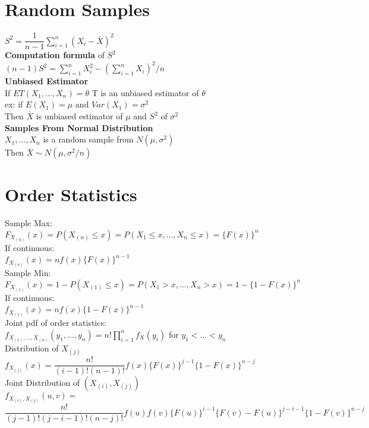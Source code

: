 \documentclass{article}
\begin{document}
\begin{flushleft}
\section*{Random Samples}
$S^2=\dfrac{1}{n-1}\sum_{i=1}^{n}(X_i-\bar{X})^2$\\
\textbf{Computation formula} of $S^2$\\
$(n-1)S^2=\sum_{i=1}^{n}X_i^2-\left(\sum_{i=1}^{n}X_i\right)^2/n$\\
\textbf{Unbiased Estimator}\\
If $ET(X_1,\dots,X_n)=\theta$ T is an unbiased estimator of $\theta$\\
ex: if $E(X_1)=\mu$ and $Var(X_1)=\sigma^2$ \\
Then $\bar{X}$ is unbiased estimator of $\mu$ and $S^2$ of $\sigma^2$\\
\textbf{Samples From Normal Distribution}\\
$X_1,\dots,X_n$ is a random sample from $N(\mu,\sigma^2)$\\
Then $\bar{X}\sim N(\mu,\sigma^2/n)$\\
\section*{Order Statistics}
Sample Max:\\
$F_{X_{(n)}}(x)=P(X_{(n)}\leq x)=P(X_1\leq x,\dots,X_n\leq x)=\{F(x)\}^n$\\
If continuous:\\
$f_{X_{(n)}}(x)=nf(x)\{F(x)\}^{n-1}$\\
Sample Min:\\
$F_{X_{(1)}}(x)=1-P(X_{(1)}\leq x)=P(X_1> x,\dots,X_n> x)=1-\{1-F(x)\}^n$\\
If continuous:\\
$f_{X_{(1)}}(x)=nf(x)\{1-F(x)\}^{n-1}$\\
Joint pdf of order statistics:\\
$f_{X_{(1)},\dots, X_{(n)}}(y_1,\dots,y_n)=n!\prod_{i=1}^{n}f_X(y_i)$ for $y_1<\dots<y_n$\\
Distribution of $X_{(j)}$\\
$f_{X_{(j)}}(x)=\dfrac{n!}{(i-1)!(n-1)!}f(x)\{F(x)\}^{j-1}\{1-F(x)\}^{n-j}$\\
Joint Distribution of $(X_{(i)},X_{(j)})$\\
$f_{X_{(i)},X_{(j)}}(u,v)=$\\
$\dfrac{n!}{(j-1)!(j-i-1)!(n-j)!}f(u)f(v)\{F(u)\}^{i-1}\{F(v)-F(u)\}^{j-i-1}\{1-F(v)\}^{n-j}$\\

\end{flushleft}
\end{document}
